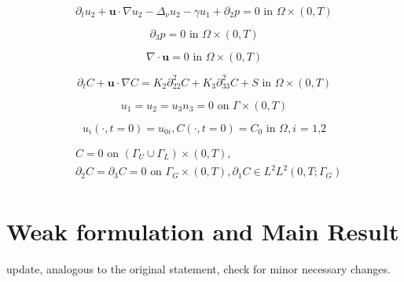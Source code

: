 \documentclass[11pt]{article}
\begin{document}
    \begin{equation} \label{HNSC2}   
    \partial_t u_2 + \mathbf{u} \cdot \nabla u_2 - \Delta_\nu u_2 -\gamma u_1 + \partial_2 p = 0 \text{ in } \Omega \times (0,T)
    \end{equation}
    
    \begin{equation} \label{HNSC3}   
    \partial_3 p = 0 \text{ in } \Omega \times (0,T)
    \end{equation}
    
    \begin{equation} \label{HNSC4}   
    \nabla \cdot \mathbf{u} = 0 \text{ in } \Omega \times (0,T)
    \end{equation}
    
    \begin{equation} \label{HNSC5}   
    \partial_t C + \mathbf{u} \cdot \nabla C = K_2 \partial_{22} ^ 2 C + K_3 \partial_{33} ^2 C + S \text{ in } \Omega \times (0,T)
    \end{equation}
    
    \begin{equation} \label{HNSC6}   
    u_1 = u_2 = u_3 n_3 = 0 \text{ on } \Gamma \times (0,T)
    \end{equation}
    
    \begin{equation} \label{HNSC7}   
    u_i (\cdot, t=0) = u_{0 i}, C (\cdot, t=0) = C_0 \text{ in } \Omega, \text{$i$ = 1,2}
    \end{equation}
    
    \begin{equation} \label{HNSC8}
      \begin{split}
        &C = 0 \text{ on } ( \Gamma_U \cup \Gamma_L) \times (0,T), \\
        & \partial_2 C = \partial_3 C = 0 \text{ on } \Gamma_G \times (0,T), \partial_1 C \in L^2 L^2 (0,T; \Gamma_G) \\
      \end{split}
    \end{equation}

\section{Weak formulation and Main Result} \label{weakformulationmainresult}

update, analogous to the original statement, check for minor necessary changes.
  
\end{document}
